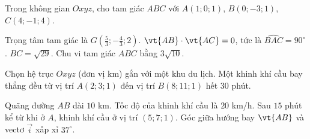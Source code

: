 \begin{bai}Trong không gian $Oxyz$, cho tam giác $ABC$ với $A(1;0;1)$, $B(0;-3;1)$, $C(4;-1;4)$.
\begin{dungsai}
  \y Trọng tâm tam giác là $G\left(\frac53;-\frac43;2\right)$. \oDS
  \y $\vt{AB}\cdot\vt{AC}=0$, tức là $\widehat{BAC}=90^\circ$. \oDS
  \y $BC=\sqrt{29}$. \oDS
  \y Chu vi tam giác $ABC$ bằng $3\sqrt{10}$. \oDS
\end{dungsai}
\end{bai}
\begin{bai}Chọn hệ trục $Oxyz$ (đơn vị km) gắn với một khu du lịch. Một khinh khí cầu bay thẳng đều từ vị trí $A(2;3;1)$ đến vị trí $B(8;11;1)$ hết $30$ phút.
\begin{dungsai}
  \y Quãng đường $AB$ dài $10$ km. \oDS
  \y Tốc độ của khinh khí cầu là $20$ km/h. \oDS
  \y Sau $15$ phút kể từ khi ở $A$, khinh khí cầu ở vị trí $(5;7;1)$. \oDS
  \y Góc giữa hướng bay $\vt{AB}$ và vectơ $\vec i$ xấp xỉ $37^\circ$. \oDS
\end{dungsai}
\end{bai}


